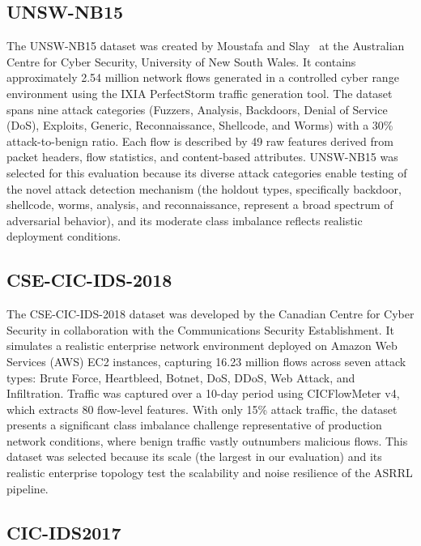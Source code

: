 \documentclass[12pt, letterpaper, oneside]{report}
\newcommand{\ASRRL}{\textsc{ASRRL}}
\begin{document}
\subsection{UNSW-NB15}

The UNSW-NB15 dataset was created by Moustafa and Slay~\cite{moustafa2015} at the Australian Centre for Cyber Security, University of New South Wales. It contains approximately 2.54 million network flows generated in a controlled cyber range environment using the IXIA PerfectStorm traffic generation tool. The dataset spans nine attack categories (Fuzzers, Analysis, Backdoors, Denial of Service (DoS), Exploits, Generic, Reconnaissance, Shellcode, and Worms) with a 30\% attack-to-benign ratio. Each flow is described by 49 raw features derived from packet headers, flow statistics, and content-based attributes. UNSW-NB15 was selected for this evaluation because its diverse attack categories enable testing of the novel attack detection mechanism (the holdout types, specifically backdoor, shellcode, worms, analysis, and reconnaissance, represent a broad spectrum of adversarial behavior), and its moderate class imbalance reflects realistic deployment conditions.

\subsection{CSE-CIC-IDS-2018}

The CSE-CIC-IDS-2018 dataset was developed by the Canadian Centre for Cyber Security in collaboration with the Communications Security Establishment. It simulates a realistic enterprise network environment deployed on Amazon Web Services (AWS) EC2 instances, capturing 16.23 million flows across seven attack types: Brute Force, Heartbleed, Botnet, DoS, DDoS, Web Attack, and Infiltration. Traffic was captured over a 10-day period using CICFlowMeter v4, which extracts 80 flow-level features. With only 15\% attack traffic, the dataset presents a significant class imbalance challenge representative of production network conditions, where benign traffic vastly outnumbers malicious flows. This dataset was selected because its scale (the largest in our evaluation) and its realistic enterprise topology test the scalability and noise resilience of the \ASRRL{} pipeline.

\subsection{CIC-IDS2017}
\end{document}
